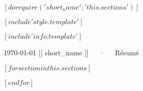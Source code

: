 $[ do require('short_name', 'this.sections') ]$

$[ include 'style.template' ]$

$[ include 'info.template' ]$



\makecvheader[C]

\makecvfooter
  {\today}
  {[[ short_name ]]~~~·~~~Résumé}
  {\thepage}

$[ for section in this.sections ]$

$[ endfor ]$


